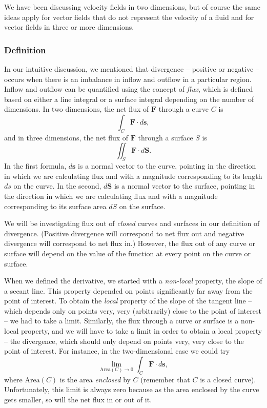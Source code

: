 \documentclass{myarticle}
\renewcommand{\vec}[1]{\mathbf{#1}}
\theoremstyle{nospace}
\newtheorem{old series theorem}{Theorem}
\newenvironment{series theorem}{\begin{mdframed}\begin{old series theorem}}{\end{old series theorem}\end{mdframed}}
\begin{document}
We have been discussing velocity fields in two dimensions, but of course the same ideas apply for vector fields that do not represent the velocity of a fluid and for vector fields in three or more dimensions.

\subsubsection{Definition} \label{sec:divergence definition}

In our intuitive discussion, we mentioned that divergence -- positive or negative -- occurs when there is an imbalance in inflow and outflow in a particular region. Inflow and outflow can be quantified using the concept of \textit{flux}, which is defined based on either a line integral or a surface integral depending on the number of dimensions. In two dimensions, the net flux of $\vec{F}$ through a curve $C$ is \[ \int_C \vec{F} \cdot d\vec{s}, \] and in three dimensions, the net flux of $\vec{F}$ through a surface $S$ is \[ \iint_S \vec{F} \cdot d\vec{S}. \] In the first formula, $d\vec{s}$ is a normal vector to the curve, pointing in the direction in which we are calculating flux and with a magnitude corresponding to its length $ds$ on the curve. In the second, $d\vec{S}$ is a normal vector to the surface, pointing in the direction in which we are calculating flux and with a magnitude corresponding to its surface area $dS$ on the surface.

We will be investigating flux out of \textit{closed} curves and surfaces in our definition of divergence. (Positive divergence will correspond to net flux out and negative divergence will correspond to net flux in.) However, the flux out of any curve or surface will depend on the value of the function at every point on the curve or surface.

When we defined the derivative, we started with a \textit{non-local} property, the slope of a secant line. This property depended on points significantly far away from the point of interest. To obtain the \textit{local} property of the slope of the tangent line -- which depends only on points very, very (arbitrarily) close to the point of interest -- we had to take a limit. Similarly, the flux through a curve or surface is a non-local property, and we will have to take a limit in order to obtain a local property -- the divergence, which should only depend on points very, very close to the point of interest. For instance, in the two-dimensional case we could try \[ \lim_{\text{Area}(C) \to 0} \int_C \vec{F} \cdot d\vec{s}, \] where $\text{Area}(C)$ is the area \textit{enclosed} by $C$ (remember that $C$ is a closed curve). Unfortunately, this limit is always zero because as the area enclosed by the curve gets smaller, so will the net flux in or out of it.
\end{document}
